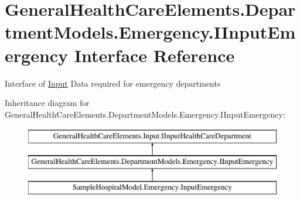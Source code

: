 \hypertarget{interface_general_health_care_elements_1_1_department_models_1_1_emergency_1_1_i_input_emergency}{}\section{General\+Health\+Care\+Elements.\+Department\+Models.\+Emergency.\+I\+Input\+Emergency Interface Reference}
\label{interface_general_health_care_elements_1_1_department_models_1_1_emergency_1_1_i_input_emergency}


Interface of \hyperlink{namespace_general_health_care_elements_1_1_input}{Input} Data required for emergency departments  


Inheritance diagram for General\+Health\+Care\+Elements.\+Department\+Models.\+Emergency.\+I\+Input\+Emergency\+:\begin{figure}[H]
\begin{center}
\leavevmode
\includegraphics[height=3.000000cm]{interface_general_health_care_elements_1_1_department_models_1_1_emergency_1_1_i_input_emergency}
\end{center}
\end{figure}
